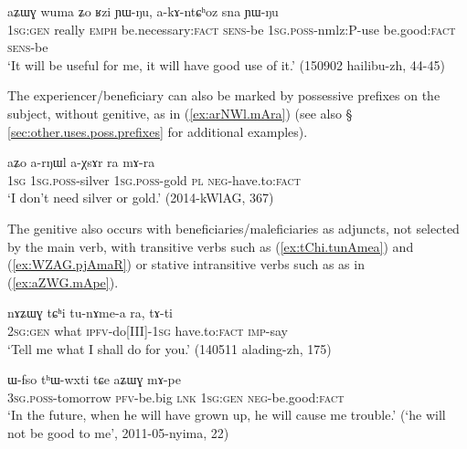 \begin{exe}
\ex \label{ex:aZWG.Rzi}
 \gll aʑɯɣ wuma ʑo ʁzi ɲɯ-ŋu, a-kɤ-ntɕʰoz sna ɲɯ-ŋu \\
  \textsc{1sg:gen} really \textsc{emph} be.necessary:\textsc{fact} \textsc{sens}-be \textsc{1sg}.\textsc{poss}-nmlz:P-use be.good:\textsc{fact}  \textsc{sens}-be \\
  \glt `It will be useful for me, it will have good use of it.'  (150902 hailibu-zh, 44-45)
\end{exe}

The experiencer/beneficiary can also be marked by possessive prefixes on the subject, without genitive, as in 
(\ref{ex:arNWl.mAra}) (see also § \ref{sec:other.uses.poss.prefixes} for additional examples).

\begin{exe}
\ex \label{ex:arNWl.mAra}
 \gll aʑo a-rŋɯl a-χsɤr ra mɤ-ra \\
 \textsc{1sg} \textsc{1sg}.\textsc{poss}-silver \textsc{1sg}.\textsc{poss}-gold \textsc{pl} \textsc{neg}-have.to:\textsc{fact} \\
 \glt `I don't  need silver or gold.' (2014-kWlAG, 367)
\end{exe}

The genitive also occurs with beneficiaries/maleficiaries as adjuncts, not selected by the main verb, with transitive verbs such as  (\ref{ex:tChi.tunAmea}) and  (\ref{ex:WZAG.pjAmaR}) or stative intransitive verbs such as  as in (\ref{ex:aZWG.mApe}).

\begin{exe}
\ex \label{ex:tChi.tunAmea}
\gll nɤʑɯɣ tɕʰi tu-nɤme-a ra, tɤ-ti  \\
\textsc{2sg}:\textsc{gen} what \textsc{ipfv}-do[III]-\textsc{1sg} have.to:\textsc{fact} \textsc{imp}-say \\
\glt `Tell me what I shall do for you.' (140511 alading-zh, 175)
\end{exe}

\begin{exe}
\ex \label{ex:aZWG.mApe}
\gll  ɯ-fso tʰɯ-wxti tɕe aʑɯɣ mɤ-pe \\ 
\textsc{3sg}.\textsc{poss}-tomorrow \textsc{pfv}-be.big \textsc{lnk} \textsc{1sg}:\textsc{gen} \textsc{neg}-be.good:\textsc{fact} \\
\glt `In the future, when he will have grown up, he will cause me trouble.' (`he will not be good to me', 2011-05-nyima, 22)
\end{exe}

